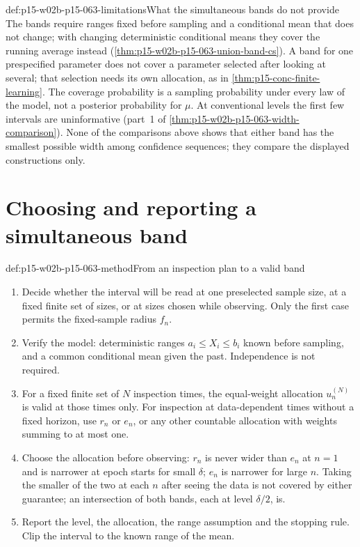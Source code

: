 \begin{hbwarning}{def:p15-w02b-p15-063-limitations}{What the simultaneous bands do not provide}
The bands require ranges fixed before sampling and a conditional mean that
does not change; with changing deterministic conditional means they cover
the running average instead
(\cref{thm:p15-w02b-p15-063-union-band-cs}). A band for one prespecified
parameter does not cover a parameter selected after looking at several;
that selection needs its own allocation, as in
\cref{thm:p15-conc-finite-learning}. The coverage probability is a
sampling probability under every law of the model, not a posterior
probability for \(\mu\). At conventional levels the first few intervals
are uninformative (part~1 of \cref{thm:p15-w02b-p15-063-width-comparison}).
None of the comparisons above shows that either band has the smallest
possible width among confidence sequences; they compare the displayed
constructions only.
\end{hbwarning}

\section{Choosing and reporting a simultaneous band}
\label{sec:p15-w02b-p15-063-method}

\begin{hbmethod}{def:p15-w02b-p15-063-method}{From an inspection plan to a valid band}
\begin{enumerate}
\item Decide whether the interval will be read at one preselected sample
 size, at a fixed finite set of sizes, or at sizes chosen while observing.
 Only the first case permits the fixed-sample radius \(f_n\).
\item Verify the model: deterministic ranges \(a_i\leq X_i\leq b_i\) known
 before sampling, and a common conditional mean given the past.
 Independence is not required.
\item For a fixed finite set of \(N\) inspection times, the equal-weight
 allocation \(u^{(N)}_n\) is valid at those times only. For inspection at
 data-dependent times without a fixed horizon, use \(r_n\) or \(e_n\), or
 any other countable allocation with weights summing to at most one.
\item Choose the allocation before observing: \(r_n\) is never wider than
 \(e_n\) at \(n=1\) and is narrower at epoch starts for small \(\delta\);
 \(e_n\) is narrower for large \(n\). Taking the smaller of the two at
 each \(n\) after seeing the data is not covered by either guarantee; an
 intersection of both bands, each at level \(\delta/2\), is.
\item Report the level, the allocation, the range assumption and the
 stopping rule. Clip the interval to the known range of the mean.
\end{enumerate}
\end{hbmethod}

